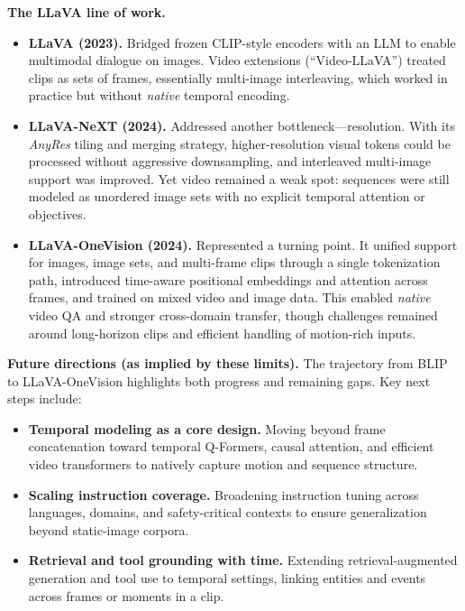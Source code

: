\begin{enrichment}
\begin{enrichment}
        \noindent\textbf{The LLaVA line of work.}
        \begin{itemize}
            \item \textbf{LLaVA (2023).} Bridged frozen CLIP-style encoders with an LLM to enable multimodal dialogue on images. Video extensions (``Video-LLaVA'') treated clips as sets of frames, essentially multi-image interleaving, which worked in practice but without \emph{native} temporal encoding.
            \item \textbf{LLaVA-NeXT (2024).} Addressed another bottleneck—resolution. With its \emph{AnyRes} tiling and merging strategy, higher-resolution visual tokens could be processed without aggressive downsampling, and interleaved multi-image support was improved. Yet video remained a weak spot: sequences were still modeled as unordered image sets with no explicit temporal attention or objectives.
            \item \textbf{LLaVA-OneVision (2024).} Represented a turning point. It unified support for images, image sets, and multi-frame clips through a single tokenization path, introduced time-aware positional embeddings and attention across frames, and trained on mixed video and image data. This enabled \emph{native} video QA and stronger cross-domain transfer, though challenges remained around long-horizon clips and efficient handling of motion-rich inputs.
        \end{itemize}
        
        \medskip
        \noindent\textbf{Future directions (as implied by these limits).}
        The trajectory from BLIP to LLaVA-OneVision highlights both progress and remaining gaps. Key next steps include:
        \begin{itemize}
            \item \textbf{Temporal modeling as a core design.} Moving beyond frame concatenation toward temporal Q-Formers, causal attention, and efficient video transformers to natively capture motion and sequence structure.
            \item \textbf{Scaling instruction coverage.} Broadening instruction tuning across languages, domains, and safety-critical contexts to ensure generalization beyond static-image corpora.
            \item \textbf{Retrieval and tool grounding with time.} Extending retrieval-augmented generation and tool use to temporal settings, linking entities and events across frames or moments in a clip.
        \end{itemize}
        

\end{enrichment}
\end{enrichment}
